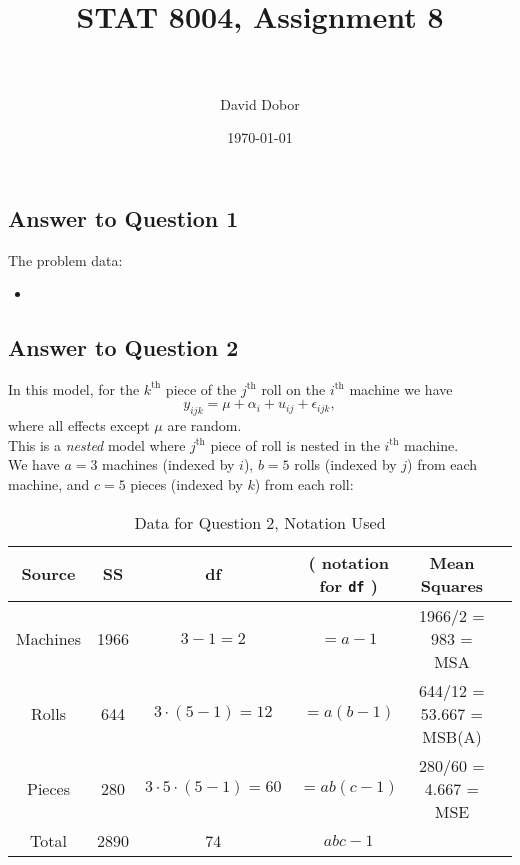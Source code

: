 \documentclass[paper=a4, fontsize=11pt]{scrartcl} %
\title{	
\normalfont \normalsize 
\horrule{0.5pt} \\[0.4cm] %
\huge STAT 8004, Assignment 8 \\ %
\horrule{2pt} \\[0.5cm] %
}
\author{David Dobor}
\date{\normalsize\today} %
\begin{document}
\maketitle 

\subsection*{Answer to Question 1}

The problem data:\\
\begin{itemize}
\item 
\end{itemize}

\bigskip
\bigskip
\subsection*{Answer to Question 2}

In this model, for the  $k^{\text{th}}$ piece of the  $j^{\text{th}}$ roll on the  $i^{\text{th}}$ machine we have
$$
y_{ijk} = \mu + \alpha_i + u_{ij} + \epsilon_{ijk},
$$
where all effects except $\mu$ are random.\\ 

This is a \emph{nested} model where $j^{\text{th}}$ piece of roll is nested in the  $i^{\text{th}}$ machine.\\

We have $a = 3$ machines (indexed by $i$), $b = 5$ rolls (indexed by $j$) from each machine, and $c = 5$ pieces (indexed by $k$) from each roll:\\
\begin{table}[H]
\caption{Data for Question 2, Notation Used} %
\centering %
\begin{tabular}{c c c c c c } %
\hline\hline %
Source & SS & df  & ( notation for \texttt{df} ) & Mean Squares\\ [0.5ex] %
\hline %
Machines & 1966 & $3 - 1 = 2$ & $ = a - 1$ & 1966/2 = 983 = MSA\\ 
Rolls & 644 & $3\cdot(5-1) = 12$  & $ = a(b - 1)$ & 644/12 = 53.667 = MSB(A)\\
Pieces & 280 & $3\cdot5\cdot(5-1) = 60$ & $ = a b (c - 1)$& 280/60 = 4.667 = MSE\\ [0.5ex]
\hline
Total & 2890 & 74  & $abc - 1$\\ [1ex] %
\hline %
\end{tabular}
\label{table:nonlin} %
\end{table}
\end{document}
